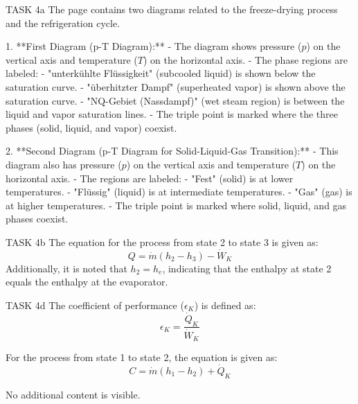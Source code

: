 TASK 4a  
The page contains two diagrams related to the freeze-drying process and the refrigeration cycle.  

1. **First Diagram (p-T Diagram):**  
   - The diagram shows pressure (\( p \)) on the vertical axis and temperature (\( T \)) on the horizontal axis.  
   - The phase regions are labeled:  
     - "unterkühlte Flüssigkeit" (subcooled liquid) is shown below the saturation curve.  
     - "überhitzter Dampf" (superheated vapor) is shown above the saturation curve.  
     - "NQ-Gebiet (Nassdampf)" (wet steam region) is between the liquid and vapor saturation lines.  
   - The triple point is marked where the three phases (solid, liquid, and vapor) coexist.  

2. **Second Diagram (p-T Diagram for Solid-Liquid-Gas Transition):**  
   - This diagram also has pressure (\( p \)) on the vertical axis and temperature (\( T \)) on the horizontal axis.  
   - The regions are labeled:  
     - "Fest" (solid) is at lower temperatures.  
     - "Flüssig" (liquid) is at intermediate temperatures.  
     - "Gas" (gas) is at higher temperatures.  
   - The triple point is marked where solid, liquid, and gas phases coexist.  

TASK 4b  
The equation for the process from state 2 to state 3 is given as:  
\[
Q = \dot{m} (h_2 - h_3) - \dot{W}_K
\]  
Additionally, it is noted that \( h_2 = h_e \), indicating that the enthalpy at state 2 equals the enthalpy at the evaporator.  

TASK 4d  
The coefficient of performance (\( \epsilon_K \)) is defined as:  
\[
\epsilon_K = \frac{\dot{Q}_K}{\dot{W}_K}
\]  

For the process from state 1 to state 2, the equation is given as:  
\[
C = \dot{m} (h_1 - h_2) + \dot{Q}_K
\]  

No additional content is visible.